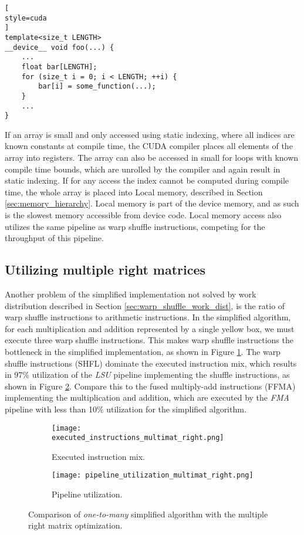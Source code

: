 \begin{lstlisting}[
style=cuda
]
template<size_t LENGTH>
__device__ void foo(...) {
	...
	float bar[LENGTH];
	for (size_t i = 0; i < LENGTH; ++i) {
		bar[i] = some_function(...);
	}
	...
}
\end{lstlisting}

If an array is small and only accessed using static indexing, where all indices are known constants at compile time, the CUDA compiler places all elements of the array into registers. The array can also be accessed in small for loops with known compile time bounds, which are unrolled by the compiler and again result in static indexing. If for any access the index cannot be computed during compile time, the whole array is placed into Local memory, described in Section \ref{sec:memory_hierarchy}. Local memory is part of the device memory, and as such is the slowest memory accessible from device code. Local memory access also utilizes the same pipeline as warp shuffle instructions, competing for the throughput of this pipeline. 

\subsection{Utilizing multiple right matrices}
\label{sec:multimat_right}

Another problem of the simplified implementation not solved by work distribution described in Section \ref{sec:warp_shuffle_work_dist}, is the ratio of warp shuffle instructions to arithmetic instructions. In the simplified algorithm, for each multiplication and addition represented by a single yellow box, we must execute three warp shuffle instructions. This makes warp shuffle instructions the bottleneck in the simplified implementation, as shown in Figure \ref{fig:executed_instructions_multimat_right}. The warp shuffle instructions (SHFL) dominate the executed instruction mix, which results in 97\% utilization of the \textit{LSU} pipeline implementing the shuffle instructions, as shown in Figure \ref{fig:pipeline_utilization_multimat_right}. Compare this to the fused multiply-add instructions (FFMA) implementing the multiplication and addition, which are executed by the \textit{FMA} pipeline with less than 10\% utilization for the simplified algorithm.


\begin{figure}[ht]
	\centering	
	\begin{subfigure}{\textwidth}
		\centering
		\texttt{[image: executed\_instructions\_multimat\_right.png]}
		\caption{Executed instruction mix.}
		\label{fig:executed_instructions_multimat_right}
	\end{subfigure}
	\hfill
	\begin{subfigure}{\textwidth}
		\centering
		\texttt{[image: pipeline\_utilization\_multimat\_right.png]}
		\caption{Pipeline utilization.}
		\label{fig:pipeline_utilization_multimat_right}
	\end{subfigure}
	
	\caption{Comparison of \textit{one-to-many} simplified algorithm with the multiple right matrix optimization.}
	\label{fig:multimat_right_profiling}
\end{figure}

